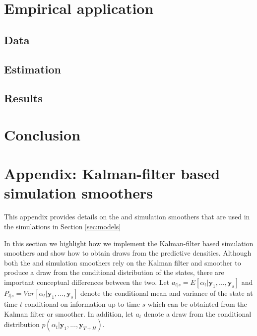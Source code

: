 \documentclass[notitlepage,a4paper,12pt]{article}
\begin{document}
\section{Empirical application}

\subsection{Data}

\subsection{Estimation}

\subsection{Results}

\section{Conclusion}




\appendix

\section{Appendix: Kalman-filter based simulation smoothers}\label{app:kalmansimsmoothers}

This appendix provides details on the \citet{carterkohn1994_biomtr} and \citet{durbinkoopman2002_biomtr} simulation smoothers that are used in the simulations in Section \ref{sec:models}



In this section we highlight how we implement the Kalman-filter based simulation smoothers and show how to obtain draws from the predictive densities. Although both the \citet{carterkohn1994_biomtr} and \citet{durbinkoopman2002_biomtr} simulation smoothers rely on the Kalman filter and smoother to produce a draw from the conditional distribution of the states, there are important conceptual differences between the two. Let $a_{t|s} = E[\alpha_t|\mathbf{y}_1, \dots, \mathbf{y}_s]$ and $P_{t|s} = Var[\alpha_t|\mathbf{y}_1, \dots, \mathbf{y}_s]$ denote the conditional mean and variance of the state at time $t$ conditional on information up to time $s$ which can be obtainted from the Kalman filter or smoother. In addition, let $a_t$ denote a draw from the conditional distribution $p(\alpha_t | \mathbf{y}_1, \dots, \mathbf{y}_{T+H})$. 
\end{document}
